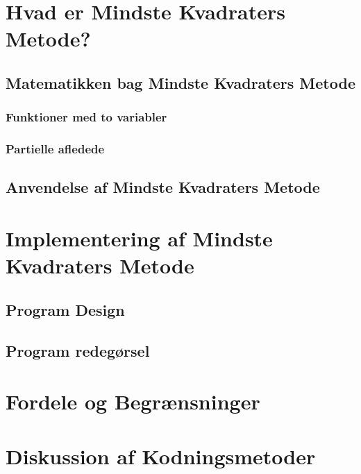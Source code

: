 \section{Hvad er Mindste Kvadraters Metode?}
\subsection{Matematikken bag Mindste Kvadraters Metode}

\subsubsection{Funktioner med to variabler}

\subsubsection{Partielle afledede}

\subsection{Anvendelse af Mindste Kvadraters Metode}


\section{Implementering af Mindste Kvadraters Metode}


\subsection{Program Design}

\subsection{Program redegørsel}

\section{Fordele og Begrænsninger}

\section{Diskussion af Kodningsmetoder}
